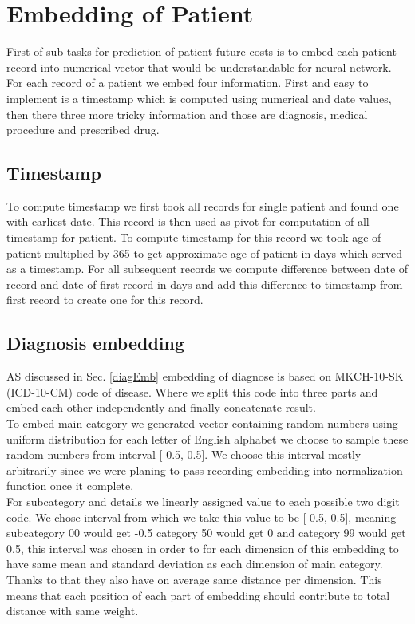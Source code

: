
\section{Embedding of Patient}
\label{embeddingImple}

First of sub-tasks for prediction of patient future costs is to embed each patient record into numerical vector that would be understandable for neural network. For each record of a patient we embed four information. First and easy to implement is a timestamp which is computed using numerical and date values, then there three more tricky information and those are diagnosis, medical procedure and prescribed drug. 

\subsection{Timestamp}

To compute timestamp we first took all records for single patient and found one with earliest date. This record is then used as pivot for computation of all timestamp for patient. To compute timestamp for this record we took age of patient multiplied by 365 to get approximate age of patient in days which served as a timestamp. For all subsequent records we compute difference between date of record and date of first record in days and add this difference to timestamp from first record to create one for this record.

\subsection{Diagnosis embedding}

AS discussed in Sec. \ref{diagEmb} embedding of diagnose is based on MKCH-10-SK (ICD-10-CM) code of disease. Where we split this code into three parts and embed each other independently and finally concatenate result.
\\

To embed main category we generated vector containing random numbers using uniform distribution for each letter of English alphabet we choose to sample these random numbers from interval [-0.5, 0.5]. We choose this interval mostly arbitrarily since we were planing to pass recording embedding into normalization function once it complete.
\\

For subcategory and details we linearly assigned value to each possible two digit code. We chose interval from which we take this value to be [-0.5, 0.5], meaning subcategory 00 would get -0.5 category 50 would get 0 and category 99 would get 0.5, this interval was chosen in order to for each dimension of this embedding to have same mean and standard deviation as each dimension of main category. Thanks to that they also have on average same distance per dimension. This means that each position of each part of embedding should contribute to total distance with same weight.
\\

